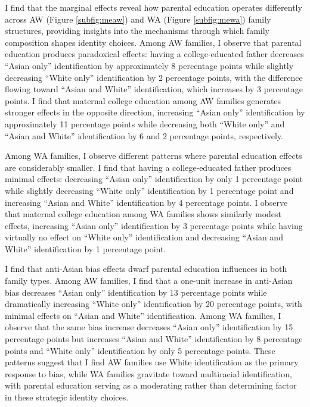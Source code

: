 I find that the marginal effects reveal how parental education operates differently across AW (Figure \ref{subfig:meaw}) and WA (Figure \ref{subfig:mewa})  family structures, providing insights into the mechanisms through which family composition shapes identity choices. Among AW families, I observe that parental education produces paradoxical effects: having a college-educated father decreases ``Asian only'' identification by approximately 8 percentage points while slightly decreasing ``White only'' identification by 2 percentage points, with the difference flowing toward ``Asian and White'' identification, which increases by 3 percentage points. I find that maternal college education among AW families generates stronger effects in the opposite direction, increasing ``Asian only'' identification by approximately 11 percentage points while decreasing both ``White only'' and ``Asian and White'' identification by 6 and 2 percentage points, respectively.

Among WA families, I observe different patterns where parental education effects are considerably smaller. I find that having a college-educated father produces minimal effects: decreasing ``Asian only'' identification by only 1 percentage point while slightly decreasing ``White only'' identification by 1 percentage point and increasing ``Asian and White'' identification by 4 percentage points. I observe that maternal college education among WA families shows similarly modest effects, increasing ``Asian only'' identification by 3 percentage points while having virtually no effect on ``White only'' identification and decreasing ``Asian and White'' identification by 1 percentage point.

I find that anti-Asian bias effects dwarf parental education influences in both family types. Among AW families, I find that a one-unit increase in anti-Asian bias decreases ``Asian only'' identification by 13 percentage points while dramatically increasing ``White only'' identification by 20 percentage points, with minimal effects on ``Asian and White'' identification. Among WA families, I observe that the same bias increase decreases ``Asian only'' identification by 15 percentage points but increases ``Asian and White'' identification by 8 percentage points and ``White only'' identification by only 5 percentage points. These patterns suggest that I find AW families use White identification as the primary response to bias, while WA families gravitate toward multiracial identification, with parental education serving as a moderating rather than determining factor in these strategic identity choices.

